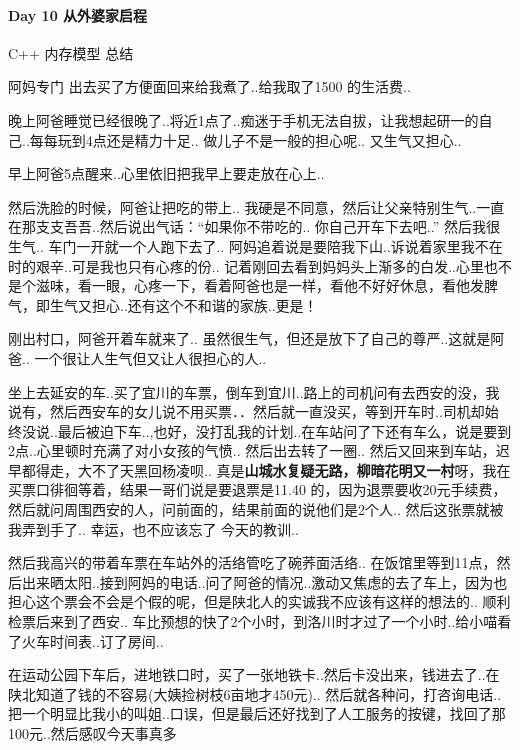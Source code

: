 \documentclass[UTF8,a4paper,8pt]{ctexart}
\begin{document}
 	 \paragraph{Day 10  从外婆家启程   \quad     }
 	 
	 	 C++  内存模型 总结
	 	 
	 	 阿妈专门 出去买了方便面回来给我煮了..给我取了1500 的生活费..
	 	 
	 	 晚上阿爸睡觉已经很晚了..将近1点了..痴迷于手机无法自拔，让我想起研一的自己..每每玩到4点还是精力十足.. 做儿子不是一般的担心呢.. 又生气又担心..
	 	 
	 	 早上阿爸5点醒来..心里依旧把我早上要走放在心上..
	 	 
	 	然后洗脸的时候，阿爸让把吃的带上.. 我硬是不同意，然后让父亲特别生气..一直在那支支吾吾..然后说出气话：“如果你不带吃的.. 你自己开车下去吧..”
	 	然后我很生气.. 车门一开就一个人跑下去了.. 阿妈追着说是要陪我下山..诉说着家里我不在时的艰辛..可是我也只有心疼的份.. 记着刚回去看到妈妈头上渐多的白发..心里也不是个滋味，看一眼，心疼一下，看着阿爸也是一样，看他不好好休息，看他发脾气，即生气又担心..还有这个不和谐的家族..更是！
	 	
	 	刚出村口，阿爸开着车就来了.. 虽然很生气，但还是放下了自己的尊严..这就是阿爸.. 一个很让人生气但又让人很担心的人..
	 	
	 	坐上去延安的车..买了宜川的车票，倒车到宜川..路上的司机问有去西安的没，我说有，然后西安车的女儿说不用买票．．然后就一直没买，等到开车时..司机却始终没说..最后被迫下车..,也好，没打乱我的计划..在车站问了下还有车么，说是要到2点..心里顿时充满了对小女孩的气愤.. 然后出去转了一圈.. 然后又回来到车站，迟早都得走，大不了天黑回杨凌呗.. 真是\textbf{山城水复疑无路，柳暗花明又一村}呀，我在买票口徘徊等着，结果一哥们说是要退票是11.40 的，因为退票要收20元手续费，然后就问周围西安的人，问前面的，结果前面的说他们是2个人.. 然后这张票就被我弄到手了.. 幸运，也不应该忘了 今天的教训..
	 	
	 	然后我高兴的带着车票在车站外的活络管吃了碗荞面活络.. 在饭馆里等到11点，然后出来晒太阳..接到阿妈的电话..问了阿爸的情况..激动又焦虑的去了车上，因为也担心这个票会不会是个假的呢，但是陕北人的实诚我不应该有这样的想法的.. 顺利检票后来到了西安..
	 	车比预想的快了2个小时，到洛川时才过了一个小时..给小喵看了火车时间表..订了房间..
	 	
	 	在运动公园下车后，进地铁口时，买了一张地铁卡..然后卡没出来，钱进去了..在陕北知道了钱的不容易(大姨捡树枝6亩地才450元).. 然后就各种问，打咨询电话.. 把一个明显比我小的叫姐..口误，但是最后还好找到了人工服务的按键，找回了那100元..然后感叹今天事真多
	 	
\end{document}
